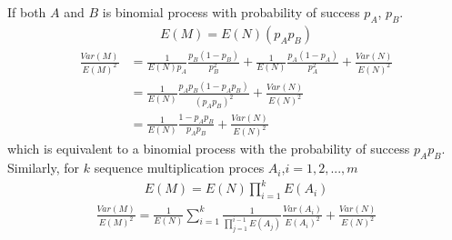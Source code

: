 If both $A$ and $B$ is binomial process with probability of success $p_A$, $p_B$. 
\begin{align}
E(M) = E(N)(p_Ap_B)
\end{align}
\begin{align}
\frac{Var(M)}{E(M)^2} & = \frac{1}{E(N)p_A}\frac{p_B(1-p_B)}{p_B^2}
+\frac{1}{E(N)}\frac{p_A(1-p_A)}{p_A^2}
+\frac{Var(N)}{E(N)^2} \\
& = \frac{1}{E(N)}\frac{p_Ap_B(1-p_Ap_B)}{(p_Ap_B)^2} 
+\frac{Var(N)}{E(N)^2} \\
& = \frac{1}{E(N)}\frac{1-p_Ap_B}{p_Ap_B}
+\frac{Var(N)}{E(N)^2}
\end{align}
which is equivalent to a binomial process with the probability of success $p_Ap_B$.
Similarly, for $k$ sequence multiplication proces $A_i$,$i=1,2,...,m$ 
\begin{align}
E(M) = E(N)\prod_{i=1}^{k}E(A_i)
\end{align}
\begin{align}
\frac{Var(M)}{E(M)^2} = \frac{1}{E(N)}\sum_{i=1}^{k}\frac{1}{\prod_{j=1}^{i-1}E(A_j)}\frac{Var(A_i)}{E(A_i)^2}
+\frac{Var(N)}{E(N)^2}
\end{align}





















